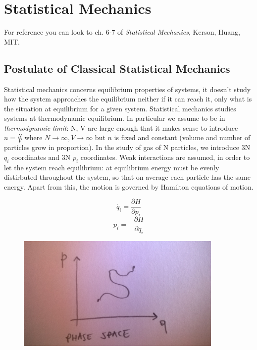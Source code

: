 \documentclass[a4paper, italian, openany]{book}
\begin{document}
\tableofcontents

\chapter{Statistical Mechanics}

For reference you can look to ch. 6-7 of \textit{Statistical Mechanics}, Kerson, Huang, MIT.

\section{Postulate of Classical Statistical Mechanics}

Statistical mechanics concerns equilibrium properties of systems, it doesn't study how the system approaches the equilibrium neither if it can reach it, only what is the situation at equilibrium for a given system.\newline
Statistical mechanics studies systems at thermodynamic equilibrium. In particular we assume to be in \textit{thermodynamic limit}: N, V are large enough that it makes sense to introduce $n = \frac{N}{V}$ where $N \rightarrow \infty, V \rightarrow \infty$ but $n$ is fixed and constant (volume and number of particles grow in proportion).\newline
In the study of gas of N particles, we introduce 3N $q_i$ coordinates and 3N $p_i$ coordinates. Weak interactions are assumed, in order to let the system reach equilibrium: at equilibrium energy must be evenly distirbuted throughout the system, so that on average each particle has the same energy. Apart from this, the motion is governed by Hamilton equations of motion.

$$\dot{q_i} = \frac{\partial H}{\partial p_i}$$
$$\dot{p_i} = - \frac{\partial H}{\partial q_i}$$

\begin{figure}[H]
\centering
\includegraphics[width=100mm]{img/figure1.jpg}
\end{figure}
\end{document}
